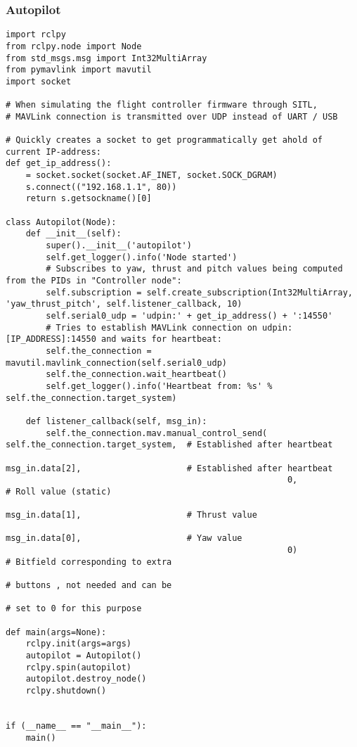 \subsubsection{Autopilot}
\begin{lstlisting}[language=PythonPlus, basicstyle=\tiny,]
import rclpy
from rclpy.node import Node
from std_msgs.msg import Int32MultiArray
from pymavlink import mavutil
import socket

# When simulating the flight controller firmware through SITL,
# MAVLink connection is transmitted over UDP instead of UART / USB

# Quickly creates a socket to get programmatically get ahold of current IP-address:
def get_ip_address():
    = socket.socket(socket.AF_INET, socket.SOCK_DGRAM)
    s.connect(("192.168.1.1", 80))
    return s.getsockname()[0]

class Autopilot(Node):
    def __init__(self):
        super().__init__('autopilot')
        self.get_logger().info('Node started')
        # Subscribes to yaw, thrust and pitch values being computed from the PIDs in "Controller node":
        self.subscription = self.create_subscription(Int32MultiArray, 'yaw_thrust_pitch', self.listener_callback, 10)
        self.serial0_udp = 'udpin:' + get_ip_address() + ':14550'
        # Tries to establish MAVLink connection on udpin:[IP_ADDRESS]:14550 and waits for heartbeat:
        self.the_connection = mavutil.mavlink_connection(self.serial0_udp)  
        self.the_connection.wait_heartbeat()
        self.get_logger().info('Heartbeat from: %s' % self.the_connection.target_system)

    def listener_callback(self, msg_in):
        self.the_connection.mav.manual_control_send(    self.the_connection.target_system,  # Established after heartbeat
                                                        msg_in.data[2],                     # Established after heartbeat
                                                        0,                                  # Roll value (static)
                                                        msg_in.data[1],                     # Thrust value
                                                        msg_in.data[0],                     # Yaw value
                                                        0)                                  # Bitfield corresponding to extra
                                                                                            # buttons , not needed and can be
                                                                                            # set to 0 for this purpose

def main(args=None):
    rclpy.init(args=args)
    autopilot = Autopilot()
    rclpy.spin(autopilot)
    autopilot.destroy_node()
    rclpy.shutdown()


if (__name__ == "__main__"):
    main()

\end{lstlisting}

